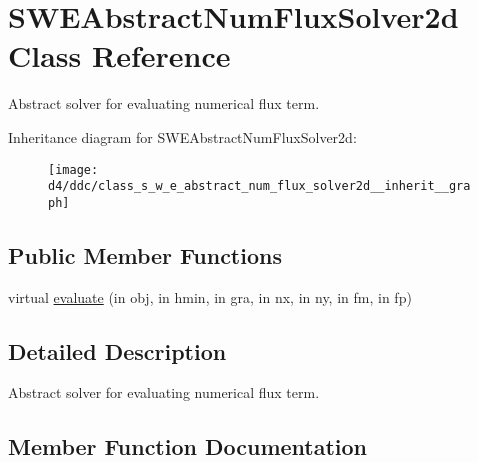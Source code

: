 \hypertarget{class_s_w_e_abstract_num_flux_solver2d}{}\section{S\+W\+E\+Abstract\+Num\+Flux\+Solver2d Class Reference}
\label{class_s_w_e_abstract_num_flux_solver2d}


Abstract solver for evaluating numerical flux term.  




Inheritance diagram for S\+W\+E\+Abstract\+Num\+Flux\+Solver2d\+:
\nopagebreak
\begin{figure}[H]
\begin{center}
\leavevmode
\texttt{[image: d4/ddc/class\_s\_w\_e\_abstract\_num\_flux\_solver2d\_\_inherit\_\_graph]}
\end{center}
\end{figure}
\subsection*{Public Member Functions}
\begin{DoxyCompactItemize}
\item 
virtual \hyperlink{class_s_w_e_abstract_num_flux_solver2d_aed92f39bab30c4d341979d87cd169108}{evaluate} (in obj, in hmin, in gra, in nx, in ny, in fm, in fp)
\end{DoxyCompactItemize}


\subsection{Detailed Description}
Abstract solver for evaluating numerical flux term. 

\subsection{Member Function Documentation}
\mbox{\label{class_s_w_e_abstract_num_flux_solver2d_aed92f39bab30c4d341979d87cd169108}} 
